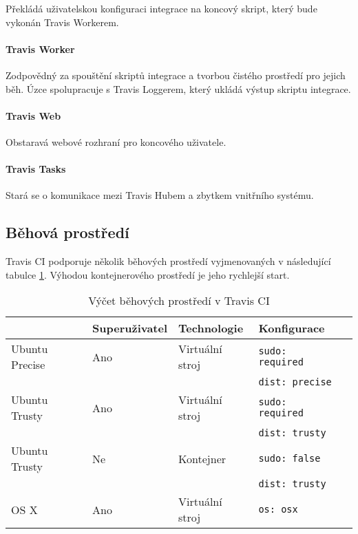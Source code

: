 Překládá uživatelskou konfiguraci integrace na koncový skript, který bude vykonán Travis Workerem.

\paragraph{Travis Worker}

Zodpovědný za spouštění skriptů integrace a tvorbou čistého prostředí pro jejich běh.
Úzce spolupracuje s Travis Loggerem, který ukládá výstup skriptu integrace.

\paragraph{Travis Web}

Obstaravá webové rozhraní pro koncového uživatele.

\paragraph{Travis Tasks}

Stará se o komunikace mezi Travis Hubem a zbytkem vnitřního systému.

\subsection{Běhová prostředí}

Travis CI podporuje několik běhových prostředí vyjmenovaných v následující tabulce \ref{table:travis-env}.
Výhodou kontejnerového prostředí je jeho rychlejší start.

\begin{table}[ht]
\centering
\caption{Výčet běhových prostředí v Travis CI}
\label{table:travis-env}
\begin{tabular}{|l|l|l|l|l|}
\hline
& Superuživatel & Technologie & Konfigurace  \\ \hline
Ubuntu Precise & Ano & Virtuální stroj & \verb|sudo: required| \\ 
& & & \verb|dist: precise|  \\ \hline
Ubuntu Trusty & Ano & Virtuální stroj & \verb|sudo: required| \\
& & & \verb|dist: trusty| \\ \hline
Ubuntu Trusty & Ne & Kontejner & \verb|sudo: false|  \\
& & & \verb|dist: trusty| \\ \hline
OS X & Ano & Virtuální stroj & \verb|os: osx|  \\ \hline
\end{tabular}
\end{table}

